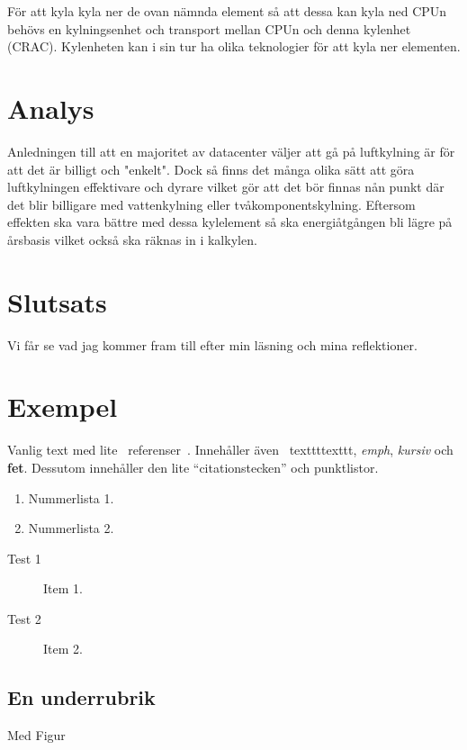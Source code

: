 \documentclass[conference,a4paper]{IEEEtran}
\begin{document}
För att kyla kyla ner de ovan nämnda element så att dessa kan kyla ned CPUn behövs en kylningsenhet 
och transport mellan CPUn och denna kylenhet (CRAC). Kylenheten kan i sin tur ha olika teknologier för
att kyla ner elementen. 
    \section{Analys}
Anledningen till att en majoritet av datacenter väljer att gå på luftkylning är för att det är billigt och 
"enkelt". Dock så finns det många olika sätt att göra luftkylningen effektivare och dyrare vilket gör att det 
bör finnas nån punkt där det blir billigare med vattenkylning eller tvåkomponentskylning. Eftersom effekten ska
vara bättre med dessa kylelement så ska energiåtgången bli lägre på årsbasis vilket också ska räknas in i kalkylen. 
\section{Slutsats}
Vi får se vad jag kommer fram till efter min läsning och mina reflektioner. 
\section{Exempel}
Vanlig text med lite~\cite{energy3} referenser~\cite{web:pox}. Innehåller även \
texttt{texttt}, \emph{emph}, \textit{kursiv} och \textbf{fet}. Dessutom innehåller
den lite ``citationstecken'' och punktlistor.

\begin{enumerate}
\item Nummerlista 1.
\item Nummerlista 2.
\end{enumerate}
\begin{description}
\item[Test 1] Item 1.
\item[Test 2] Item 2.
\end{description}
\subsection{En underrubrik}
Med Figur
\lipsum[1]
\printbibliography
\end{document}
